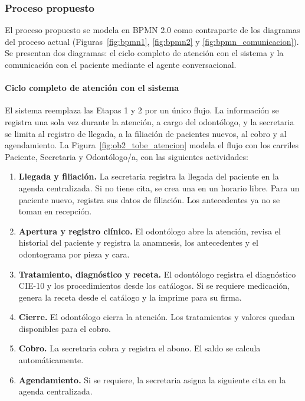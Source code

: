 \subsubsection{Proceso propuesto}

El proceso propuesto se modela en BPMN 2.0 como contraparte de los diagramas del proceso actual (Figuras~\ref{fig:bpmn1}, \ref{fig:bpmn2} y \ref{fig:bpmn_comunicacion}). Se presentan dos diagramas: el ciclo completo de atención con el sistema y la comunicación con el paciente mediante el agente conversacional.

\paragraph{Ciclo completo de atención con el sistema}

El sistema reemplaza las Etapas 1 y 2 por un único flujo. La información se registra una sola vez durante la atención, a cargo del odontólogo, y la secretaria se limita al registro de llegada, a la filiación de pacientes nuevos, al cobro y al agendamiento. La Figura~\ref{fig:ob2_tobe_atencion} modela el flujo con los carriles Paciente, Secretaria y Odontólogo/a, con las siguientes actividades:

\begin{enumerate}[leftmargin=*]
    \item \textbf{Llegada y filiación.} La secretaria registra la llegada del paciente en la agenda centralizada. Si no tiene cita, se crea una en un horario libre. Para un paciente nuevo, registra sus datos de filiación. Los antecedentes ya no se toman en recepción.

    \item \textbf{Apertura y registro clínico.} El odontólogo abre la atención, revisa el historial del paciente y registra la anamnesis, los antecedentes y el odontograma por pieza y cara.

    \item \textbf{Tratamiento, diagnóstico y receta.} El odontólogo registra el diagnóstico CIE-10 y los procedimientos desde los catálogos. Si se requiere medicación, genera la receta desde el catálogo y la imprime para su firma.

    \item \textbf{Cierre.} El odontólogo cierra la atención. Los tratamientos y valores quedan disponibles para el cobro.

    \item \textbf{Cobro.} La secretaria cobra y registra el abono. El saldo se calcula automáticamente.

    \item \textbf{Agendamiento.} Si se requiere, la secretaria asigna la siguiente cita en la agenda centralizada.
\end{enumerate}

